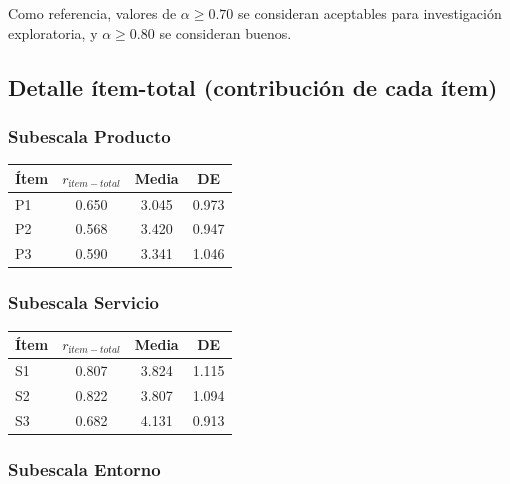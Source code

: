 \documentclass[
  spanish,
]{article}
\begin{document}
Como referencia, valores de \(\alpha \geq 0.70\) se consideran
aceptables para investigación exploratoria, y \(\alpha \geq 0.80\) se
consideran buenos.

\subsection{Detalle ítem-total (contribución de cada
ítem)}\label{detalle-uxedtem-total-contribuciuxf3n-de-cada-uxedtem}

\subsubsection{Subescala Producto}\label{subescala-producto}

\begin{table}[!h]
\centering
\begin{tabular}{lccc}
\toprule
Ítem & $r_{ítem-total}$ & Media & DE\\
\midrule
P1 & 0.650 & 3.045 & 0.973\\
P2 & 0.568 & 3.420 & 0.947\\
P3 & 0.590 & 3.341 & 1.046\\
\bottomrule
\end{tabular}
\end{table}

\subsubsection{Subescala Servicio}\label{subescala-servicio}

\begin{table}[!h]
\centering
\begin{tabular}{lccc}
\toprule
Ítem & $r_{ítem-total}$ & Media & DE\\
\midrule
S1 & 0.807 & 3.824 & 1.115\\
S2 & 0.822 & 3.807 & 1.094\\
S3 & 0.682 & 4.131 & 0.913\\
\bottomrule
\end{tabular}
\end{table}

\subsubsection{Subescala Entorno}\label{subescala-entorno}
\end{document}
